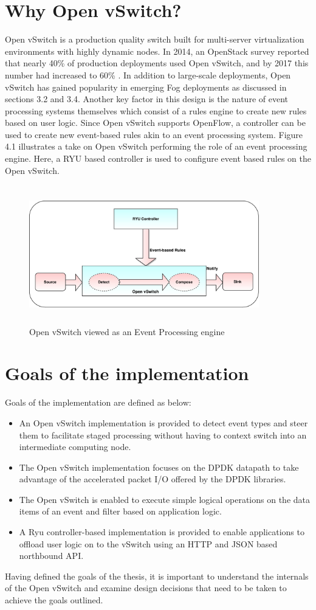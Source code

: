\section{Why Open vSwitch?}
Open vSwitch is a production quality switch built for multi-server virtualization environments with highly dynamic nodes. In 2014, an OpenStack survey \cite{OpenStack14} reported that nearly 40\% of production deployments used Open vSwitch, and by 2017 this number had increased to 60\% \cite{OpenStack17}. In addition to large-scale deployments, Open vSwitch has gained popularity in emerging Fog deployments as discussed in sections 3.2 and 3.4. Another key factor in this design is the nature of event processing systems themselves which consist of a rules engine to create new rules based on user logic. Since Open vSwitch supports OpenFlow, a controller can be used to create new event-based rules akin to an event processing system. Figure 4.1 illustrates a take on Open vSwitch performing the role of an event processing engine. Here, a RYU based controller is used to configure event based rules on the Open vSwitch. 
 \begin{figure}[H]
 \centering
 \caption{Open vSwitch viewed as an Event Processing engine} 
 \includegraphics[height=6cm,width=10cm]{evsep01.pdf}
\end{figure}

\section{Goals of the implementation}
Goals of the implementation are defined as below:
\begin{itemize}
\item An Open vSwitch implementation is provided to detect event types and steer them to facilitate staged processing without having to context switch into an intermediate computing node.
\item The Open vSwitch implementation focuses on the DPDK datapath to take advantage of the accelerated packet I/O offered by the DPDK libraries.
\item The Open vSwitch is enabled to execute simple logical operations on the data items of an event and filter based on application logic. 
\item A Ryu controller-based implementation is provided to enable applications to offload user logic on to the vSwitch using an HTTP and JSON based northbound API.
\end{itemize}
Having defined the goals of the thesis, it is important to understand the internals of the Open vSwitch and examine design decisions that need to be taken to achieve the goals outlined.

